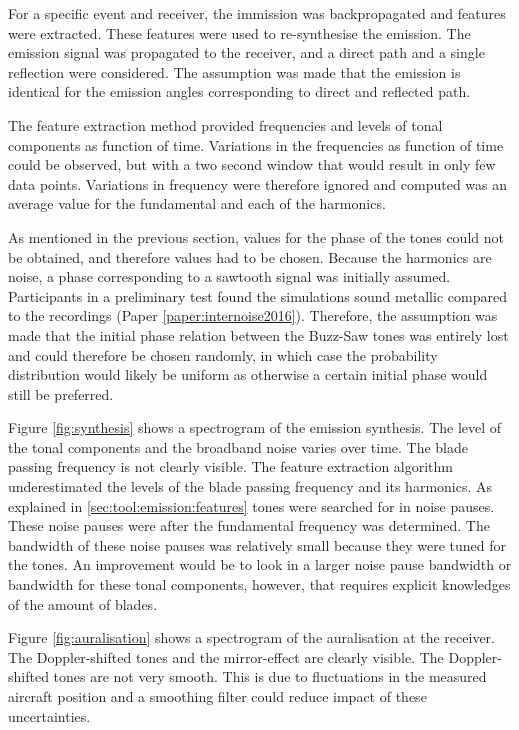 For a specific event and receiver, the immission was backpropagated and features
were extracted. These features were used to re-synthesise the emission. The
emission signal was propagated to the receiver, and a direct path and a single
reflection were considered. The assumption was made that the emission is
identical for the emission angles corresponding to direct and reflected path.

The feature extraction method provided frequencies and levels of tonal
components as function of time. Variations in the frequencies as function of
time could be observed, but with a two second window that would result in only
few data points. Variations in frequency were therefore ignored and computed was an
average value for the fundamental and each of the harmonics.

As mentioned in the previous section, values for the phase of the tones could
not be obtained, and therefore values had to be chosen. Because the harmonics
are  noise, a phase corresponding to a sawtooth signal was
initially assumed. Participants in a preliminary test found the simulations
sound metallic compared to the recordings (Paper \ref{paper:internoise2016}).
Therefore, the assumption was made that the initial phase relation between the
Buzz-Saw tones was entirely lost and could therefore be chosen randomly, in
which case the probability distribution would likely be uniform as otherwise a
certain initial phase would still be preferred.

Figure \ref{fig:synthesis} shows a spectrogram of the emission synthesis. The
level of the tonal components and the broadband noise varies over time. The
blade passing frequency is not clearly visible. The feature extraction algorithm
underestimated the levels of the blade passing frequency and its harmonics. As
explained in \ref{sec:tool:emission:features} tones were searched for in noise
pauses. These noise pauses were  after the fundamental frequency
was determined. The bandwidth of these noise pauses was relatively small because
they were tuned for the  tones. An improvement would be to look in
a larger noise pause bandwidth or bandwidth for these tonal components, however,
that requires explicit knowledges of the amount of blades.

Figure \ref{fig:auralisation} shows a spectrogram
of the auralisation at the receiver. The Doppler-shifted tones and the
mirror-effect are clearly visible. The Doppler-shifted tones are not very
smooth. This is due to fluctuations in the measured aircraft position and a smoothing filter
could reduce impact of these uncertainties.

